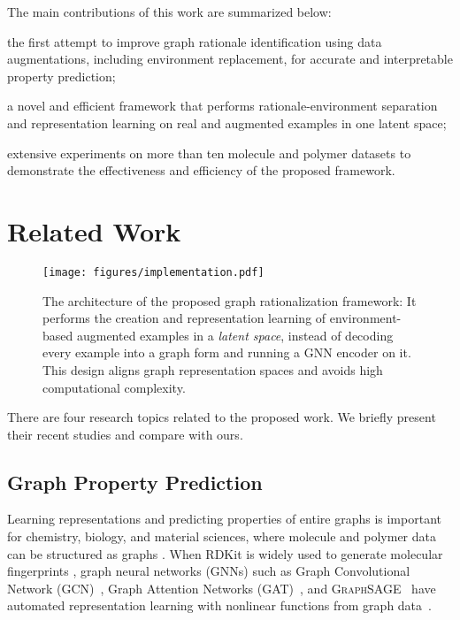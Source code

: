 \documentclass[sigconf]{acmart}
\begin{document}
The main contributions of this work are summarized below:
\begin{compactitem}
    \item the first attempt to improve graph rationale identification using data augmentations, including environment replacement, for accurate and interpretable property prediction;
    \item a novel and efficient framework that performs rationale-environment separation and representation learning on real and augmented examples in one latent space;
    \item extensive experiments on more than ten molecule and polymer datasets to demonstrate the effectiveness and efficiency of the proposed framework.
\end{compactitem} 
\section{Related Work}
\label{sec:related}
\begin{figure*}[t]
    \centering
    \texttt{[image: figures/implementation.pdf]}
    \vspace{-0.15in}
    \caption{The architecture of the proposed graph rationalization framework: It performs the creation and representation learning of environment-based augmented examples in a \emph{latent space}, instead of decoding every example into a graph form and running a GNN encoder on it. This design aligns graph representation spaces and avoids high computational complexity.}
    \label{fig:implementation}
    \vspace{-0.1in}
\end{figure*}

There are four research topics related to the proposed work. We briefly present their recent studies and compare with ours.

\subsection{Graph Property Prediction}

Learning representations and predicting properties of entire graphs is important for chemistry, biology, and material sciences, where molecule and polymer data can be structured as graphs \cite{hu2020open}.
When RDKit is widely used to generate molecular fingerprints \cite{landrum2013rdkit}, 
graph neural networks (GNNs) such as Graph Convolutional Network (GCN)~\cite{kipf2017semi}, Graph Attention Networks (GAT)~\cite{velivckovic2018graph}, and \textsc{GraphSAGE}~\cite{hamilton2017inductive} have automated representation learning with nonlinear functions from graph data~\cite{zhang2020deep,wu2020comprehensive,ma2021unified,wang2020calendar,wang2021dynamic,wang2021modeling,wang2021modeling_tkde,zhao2021synergistic,jiang2022federated}.
\end{document}
